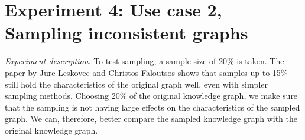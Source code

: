 \documentclass[11pt,letterpaper ,oneside ]{book}
\begin{document}
	\section{Experiment 4: Use case 2, Sampling inconsistent graphs} 
	\begin{table}[!t]
		\centering
		\caption{table showing several statistics about graphs.}
		\label{table:GraphStatsSample}
	\end{table}
	\textit{Experiment description}. To test sampling, a sample size of 20\% is taken. The paper by Jure Leskovec and Christos Faloutsos \cite{Leskovec:2006} shows that samples up to 15\% still hold the characteristics of the original graph well, even with simpler sampling methods. Choosing 20\% of the original knowledge graph, we make sure that the sampling is not having large effects on the characteristics of the sampled graph. We can, therefore, better compare the sampled knowledge graph with the original knowledge graph. \\
	
\end{document}
